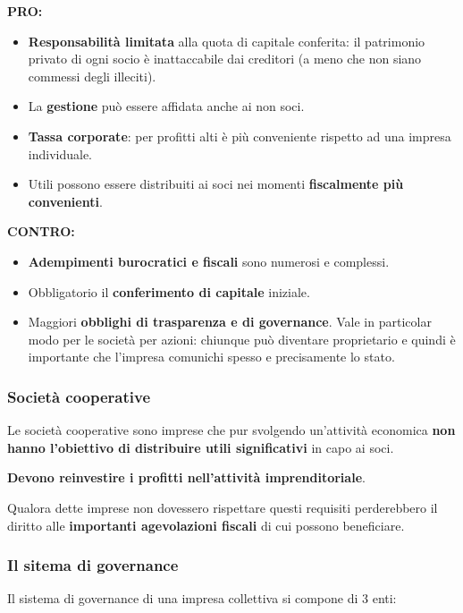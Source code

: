 \documentclass[../main.tex]{subfiles}
\begin{document}
\textbf{PRO:}
\begin{itemize}
\item \textbf{Responsabilità limitata} alla quota di capitale conferita: il patrimonio privato di ogni socio è inattaccabile dai creditori (a meno che non siano commessi degli illeciti).
\item La \textbf{gestione} può essere affidata anche ai non soci.
\item \textbf{Tassa corporate}: per profitti alti è più conveniente rispetto ad una impresa individuale.
\item Utili possono essere distribuiti ai soci nei momenti \textbf{fiscalmente più convenienti}.

\end{itemize}

\textbf{CONTRO:}
\begin{itemize}
\item \textbf{Adempimenti burocratici e fiscali} sono numerosi e complessi.
\item Obbligatorio il \textbf{conferimento di capitale} iniziale.
\item Maggiori \textbf{obblighi di trasparenza e di governance}. Vale in particolar modo per le società per azioni: chiunque può diventare proprietario e quindi è importante che l'impresa comunichi spesso e precisamente lo stato.

\end{itemize}

\subsubsection{Società cooperative}

Le società cooperative sono imprese che pur svolgendo un'attività economica \textbf{non hanno l'obiettivo di distribuire utili significativi} in capo ai soci.

\textbf{Devono reinvestire i profitti nell'attività imprenditoriale}.

Qualora dette imprese non dovessero rispettare questi requisiti perderebbero il diritto alle \textbf{importanti agevolazioni fiscali} di cui possono beneficiare.

\subsubsection{Il sitema di governance}

Il sistema di governance di una impresa collettiva si compone di 3 enti:
\end{document}
